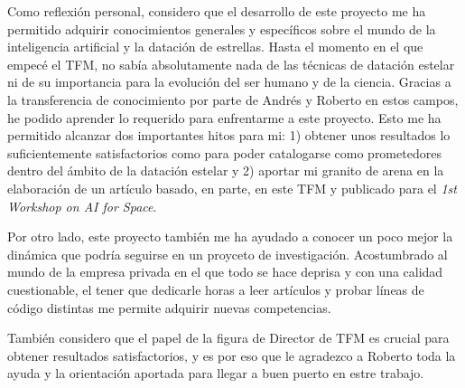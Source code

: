 Como reflexión personal, considero que el desarrollo de este proyecto me ha permitido adquirir conocimientos generales y específicos sobre el mundo de la inteligencia artificial y la datación de estrellas. Hasta el momento en el que empecé el TFM, no sabía absolutamente nada de las técnicas de datación estelar ni de su importancia para la evolución del ser humano y de la ciencia. Gracias a la transferencia de conocimiento por parte de Andrés y Roberto en estos campos, he podido aprender lo requerido para enfrentarme a este proyecto. Esto me ha permitido alcanzar dos importantes hitos para mi: 1) obtener unos resultados lo suficientemente satisfactorios como para poder catalogarse como prometedores dentro del ámbito de la datación estelar y 2) aportar mi granito de arena en la elaboración de un artículo basado, en parte, en este TFM y publicado para el \emph{1st Workshop on AI for Space}. 

Por otro lado, este proyecto también me ha ayudado a conocer un poco mejor la dinámica que podría seguirse en un proyceto de investigación. Acostumbrado al mundo de la empresa privada en el que todo se hace deprisa y con una calidad cuestionable, el tener que dedicarle horas a leer artículos y probar líneas de código distintas me permite adquirir nuevas competencias.

También considero que el papel de la figura de Director de TFM es crucial para obtener resultados satisfactorios, y es por eso que le agradezco a Roberto toda la ayuda y la orientación aportada para llegar a buen puerto en estre trabajo.





















